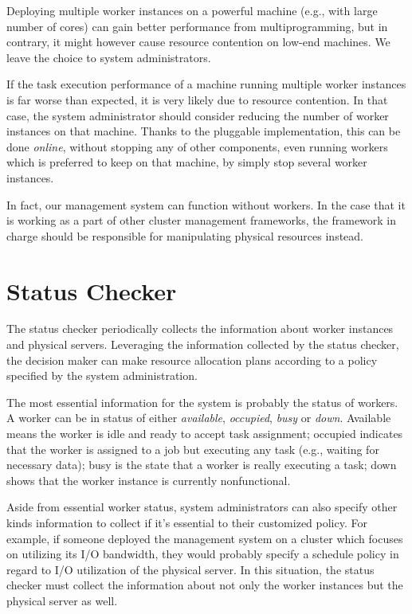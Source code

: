Deploying multiple worker instances on a powerful machine (e.g., with
large number of cores) can gain better performance from
multiprogramming, but in contrary, it might however cause resource
contention on low-end machines.  We leave the choice to system
administrators.  

If the task execution performance of a machine running multiple worker
instances is far worse than expected, it is very likely due to resource
contention.  In that case, the system administrator should consider
reducing the number of worker instances on that machine.  Thanks to the
pluggable implementation, this can be done \emph{online}, without
stopping any of other components, even running workers which is
preferred to keep on that machine, by simply stop several worker
instances.

In fact, our management system can function without workers.  In the
case that it is working as a part of other cluster management
frameworks, the framework in charge should be responsible for
manipulating physical resources instead.

\section{Status Checker}

The status checker periodically collects the information about worker
instances and physical servers.  Leveraging the information collected
by the status checker, the decision maker can make resource allocation
plans according to a policy specified by the system administration.

The most essential information for the system is probably the status of
workers.  A worker can be in status of either \emph{available},
\emph{occupied}, \emph{busy} or \emph{down}.  Available means the worker
is idle and ready to accept task assignment; occupied indicates that the
worker is assigned to a job but executing any task (e.g., waiting for
necessary data); busy is the state that a worker is really executing a
task; down shows that the worker instance is currently nonfunctional. 

Aside from essential worker status, system administrators can also
specify other kinds information to collect if it's essential to  their
customized policy.  For example, if someone deployed the management
system on a cluster which focuses on utilizing its I/O bandwidth, they
would probably specify a schedule policy in regard to I/O utilization of
the physical server.  In this situation, the status checker must collect
the information about not only the worker instances but the physical
server as well.


